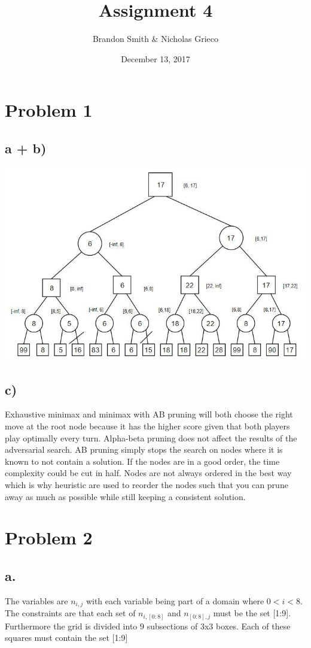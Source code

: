 \documentclass[11pt]{article} %
\title{Assignment 4}
\author{Brandon Smith \& Nicholas Grieco}
\date{December 13, 2017}
\begin{document}
\maketitle

\section*{Problem 1}
\subsection*{a + b)}
\includegraphics[scale=0.45]{prob1}
\subsection*{c)}
Exhaustive minimax and minimax with AB pruning will both choose the right move at the root node because it has the higher score given that both players play optimally every turn. Alpha-beta pruning does not affect the results of the adversarial search. AB pruning simply stops the search on nodes where it is known to not contain a solution. If the nodes are in a good order, the time complexity could be cut in half. Nodes are not always ordered in the best way which is why heuristic are used to reorder the nodes such that you can prune away as much as possible while still keeping a consistent solution.

\section*{Problem 2}

\subsection*{a.}
The variables are $n_{i,j}$ with each variable being part of a domain where  $ 0 < i < 8 $. The constraints are that each set of $n_{i,[0:8]}$ and $n_{[0:8],j}$ must be the set [1:9]. Furthermore the grid is divided into 9 subsections of 3x3 boxes. Each of these squares must contain the set [1:9]
\end{document}
